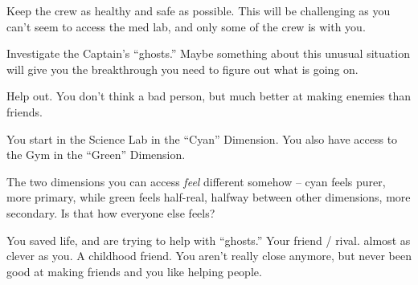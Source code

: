 \documentclass[char]{TMFHope}
\begin{document}
\begin{itemz}[Goals]
	\item Keep the crew as healthy and safe as possible. This will be challenging as you can't seem to access the med lab, and only some of the crew is with you.
	\item Investigate the Captain's ``ghosts.'' Maybe something about this unusual situation will give you the breakthrough you need to figure out what is going on.
	\item Help \cDip{} out. You don't think \cDip{\they} \cDip{\are} a bad person, but \cDip{\they} \cDip{\are} much better at making enemies than friends.
\end{itemz}

\begin{itemz}[Notes]
	\item You start in the Science Lab in the ``Cyan'' Dimension. You also have access to the Gym in the ``Green'' Dimension. 
	\item The two dimensions you can access {\em feel} different somehow -- cyan feels purer, more primary, while green feels half-real, halfway between other dimensions, more secondary.  Is that how everyone else feels?
\end{itemz}

\begin{contacts}
	\contact{\cCap{}} You saved \cCap{\their} life, and are trying to help \cCap{\them} with \cCap{\their} ``ghosts.''
	\contact{\cSci{}} Your friend / rival. \cSci{\They} \cSci{\are} almost as clever as you.
	\contact{\cDip{}} A childhood friend. You aren't really close anymore, but \cDip{\they} \cDip{\have} never been good at making friends and you like helping people.
\end{contacts}
\end{document}
